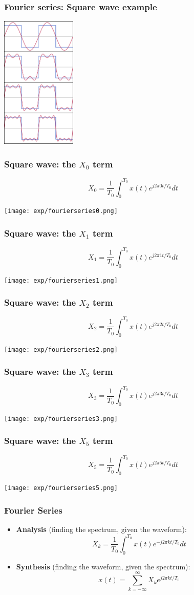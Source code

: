 \documentclass{beamer}
\begin{document}
\begin{frame}
  \frametitle{Fourier series: Square wave example}
  \centerline{\includegraphics[height=2.5in]{squarewave.png}}
\end{frame}

\begin{frame}
  \frametitle{Square wave: the $X_0$ term}
    \[
    X_0 = \frac{1}{T_0}\int_0^{T_0} x(t)e^{j2\pi 0 t/T_0}dt
    \]
  \centerline{\texttt{[image: exp/fourierseries0.png]}}
\end{frame}

\begin{frame}
  \frametitle{Square wave: the $X_1$ term}
    \[
    X_1 = \frac{1}{T_0}\int_0^{T_0} x(t)e^{j2\pi 1 t/T_0}dt
    \]
  \centerline{\texttt{[image: exp/fourierseries1.png]}}
\end{frame}

\begin{frame}
  \frametitle{Square wave: the $X_2$ term}
    \[
    X_2 = \frac{1}{T_0}\int_0^{T_0} x(t)e^{j2\pi 2 t/T_0}dt
    \]
  \centerline{\texttt{[image: exp/fourierseries2.png]}}
\end{frame}

\begin{frame}
  \frametitle{Square wave: the $X_3$ term}
    \[
    X_3 = \frac{1}{T_0}\int_0^{T_0} x(t)e^{j2\pi 3 t/T_0}dt
    \]
  \centerline{\texttt{[image: exp/fourierseries3.png]}}
\end{frame}

\begin{frame}
  \frametitle{Square wave: the $X_5$ term}
    \[
    X_5 = \frac{1}{T_0}\int_0^{T_0} x(t)e^{j2\pi 5 t/T_0}dt
    \]
  \centerline{\texttt{[image: exp/fourierseries5.png]}}
\end{frame}

\begin{frame}
  \frametitle{Fourier Series}

  \begin{itemize}
  \item {\bf Analysis}  (finding the spectrum, given the waveform):
    \[
    X_k = \frac{1}{T_0}\int_0^{T_0} x(t)e^{-j2\pi kt/T_0}dt
    \]
  \item {\bf Synthesis} (finding the waveform, given the spectrum):
    \[
    x(t) = \sum_{k=-\infty}^\infty X_k e^{j2\pi kt/T_0}
    \]
  \end{itemize}
  
\end{frame}  
\end{document}
